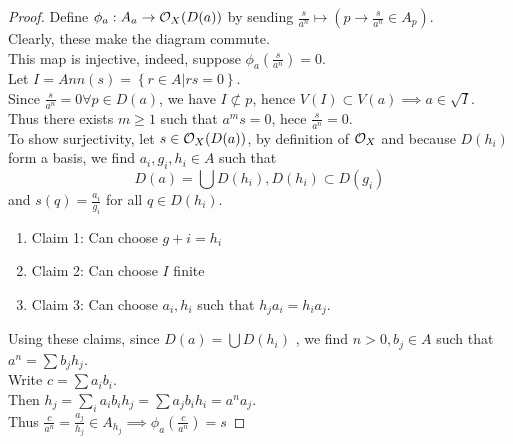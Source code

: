 \documentclass[../main.tex]{subfiles}
\begin{document}
\begin{proof}
Define $\phi_a: A_a \to \mathcal{O}_X( D( a) ) $ by sending $\frac{s}{a^{n}}\mapsto ( p \to \frac{s}{a^{n}}\in A_p) $.\\
Clearly, these make the diagram commute.\\
This map is injective, indeed, suppose $\phi_a( \frac{s}{a^{n}}) =0$.\\
Let $I = Ann( s) = \left\{ r \in A | rs = 0 \right\} $.\\
Since $\frac{s}{a^{n}}= 0 \forall p\in D( a) $, we have $I \not\subset p$, hence $V( I) \subset V( a) \implies a \in \sqrt{I} $.\\
Thus there exists $m \geq 1$ such that $a^{m}s = 0$, hece $\frac{s}{a^{n}}=0$.\\
To show surjectivity, let $s\in \mathcal{O}_X( D( a) ) $, by definition of $\mathcal{O}_X$ and because $D( h_i) $ form a basis, we find $a_i, g_i, h_i \in A$ such that
\[ 
D( a) = \bigcup D( h_i) , D( h_i) \subset D( g_i ) 
\]
and $s( q) = \frac{a_i }{g_i}$ for all $q \in D( h_i) $.\\
\begin{enumerate}
\item Claim 1: Can choose $g+i = h_i$ 
\item Claim 2: Can choose $I $ finite
\item Claim 3: Can choose $a_i, h_i$ such that $h_j a_i = h_i a_j$.\\
\end{enumerate}
Using these claims, since $D( a) = \bigcup D( h_i)$ , we find $n>0,b_j \in A$ such that $a^{n}= \sum b_j h_j $.\\
Write $c= \sum a_i b_i$.\\
Then $h_j = \sum_i a_i b_i h_j = \sum a_j b_i h_i = a^{n}a_j $.\\
Thus $\frac{c}{a^{n}}= \frac{a_j }{h_j }\in A_{h_j }\implies \phi_a ( \frac{c}{a^{n}}) =s  $ 

\end{proof}




			


	

	
\end{document}
